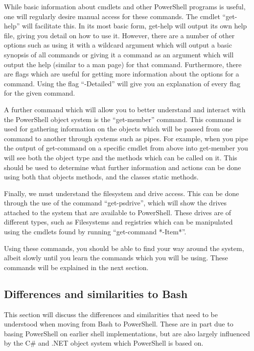 			While basic information about cmdlets and other PowerShell programs is useful, one will regularly desire manual access for these commands. 
			The cmdlet ``get-help'' will facilitate this. 
			In its most basic form, get-help will output its own help file, giving you detail on how to use it. 
			However, there are a number of other options such as using it with a wildcard argument which will output a basic synopsis of all commands or giving it a command as an argument which will output the help (similar to a man page) for that command. 
			Furthermore, there are flags which are useful for getting more information about the options for a command. 
			Using the flag ``-Detailed'' will give you an explanation of every flag for the given command.

			A further command which will allow you to better understand and interact with the PowerShell object system is the ``get-member'' command. 
			This command is used for gathering information on the objects which will be passed from one command to another through systems such as pipes. 
			For example, when you pipe the output of get-command on a specific cmdlet from above into get-member you will see both the object type and the methods which can be called on it. 
			This should be used to determine what further information and actions can be done using both that objects methods, and the classes static methods. 

			Finally, we must understand the filesystem and drive access. 
			This can be done through the use of the command ``get-psdrive'', which will show the drives attached to the system that are available to PowerShell. 
			These drives are of different types, such as Filesystems and registries which can be manipulated using the cmdlets found by running ``get-command *-Item*''. 

			Using these commands, you should be able to find your way around the system, albeit slowly until you learn the commands which you will be using. 
			These commands will be explained in the next section. 

		\subsection{Differences and similarities to Bash}
			This section will discuss the differences and similarities that need to be understood when moving from Bash to PowerShell. 
			These are in part due to basing PowerShell on earlier shell implementations, but are also largely influenced by the C\# and .NET object system which PowerShell is based on. 

